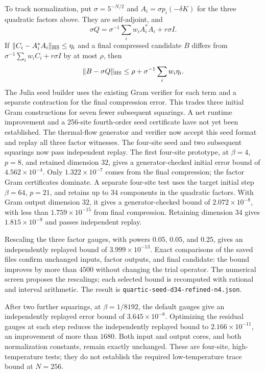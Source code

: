 \documentclass[11pt]{article}
\begin{document}
To track normalization, put $\sigma=5^{-N/2}$ and
$A_i=\sigma p_i(-\delta K)$ for the three quadratic factors above.
They are self-adjoint, and
\[
 \sigma Q=\sigma^{-1}\sum_i w_i A_i^*A_i+r\sigma I.
\]
If $\|C_i-A_i^*A_i\|_{\rm HS}\le\eta_i$ and a final compressed
candidate $B$ differs from
$\sigma^{-1}\sum_iw_i C_i+r\sigma I$ by at most $\rho$, then
\[
 \|B-\sigma Q\|_{\rm HS}\le
 \rho+\sigma^{-1}\sum_iw_i\eta_i.
\]
The Julia seed builder uses the existing Gram verifier for each term and
a separate contraction for the final compression error. This trades
three initial Gram constructions for seven fewer subsequent squarings.
A net runtime improvement and a 256-site fourth-order seed certificate
have not yet been established.
The thermal-flow generator and verifier now accept this seed format and
replay all three factor witnesses. The four-site seed and two subsequent
squarings now pass independent replay.
The first four-site prototype, at
$\beta=4$, $p=8$, and retained dimension $32$, gives a generator-checked
initial error bound of $4.562\times10^{-4}$. Only
$1.322\times10^{-7}$ comes from the final compression; the factor Gram
certificates dominate. A separate
four-site test uses the target initial step $\beta=64$, $p=21$, and
retains up to $34$ components in the quadratic factors. With Gram output
dimension $32$, it gives a generator-checked bound of
$2.072\times10^{-8}$, with less than $1.759\times10^{-15}$ from final
compression. Retaining dimension $34$ gives $1.815\times10^{-9}$ and
passes independent replay.

Rescaling the three factor gauges, with powers $0.05$, $0.05$, and
$0.25$, gives an independently replayed bound of $3.999\times10^{-13}$.
Exact comparisons of the saved files confirm unchanged inputs, factor
outputs, and final candidate: the bound improves by more than $4500$
without changing the trial operator. The numerical screen proposes the
rescalings; each selected bound is recomputed with rational and interval
arithmetic. The result
is \texttt{quartic-seed-d34-refined-n4.json}.

After two further squarings, at $\beta=1/8192$, the default gauges give
an independently replayed error bound of $3.645\times10^{-8}$.
Optimizing the residual gauges at each step reduces the independently replayed
bound to $2.166\times10^{-11}$, an improvement of more than $1680$.
Both input and output cores, and both normalization constants, remain
exactly unchanged.
These are four-site, high-temperature tests; they do not establish the
required low-temperature trace bound at $N=256$.
\end{document}
